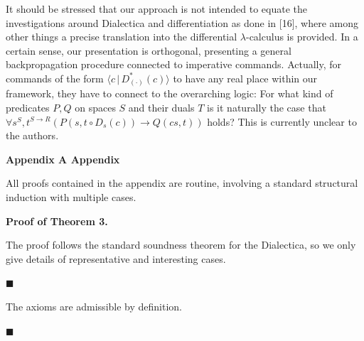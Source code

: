  
 
It should be stressed that our approach is not intended to equate the investigations around Dialectica and differentiation as done in [16], where among other things a precise translation into the differential $\lambda$-calculus is provided. In a certain sense, our presentation is orthogonal, presenting a general backpropagation procedure connected to imperative commands. Actually, for commands of the form $\langle{c}\,|\,{D^{\ast}_{(\cdot)}({c})}\rangle$ to have any real place within our framework, they have to connect to the overarching logic: For what kind of predicates $P,Q$ on spaces $S$ and their duals $T$ is it naturally the case that $\forall s^{S},t^{S\to R}\left(P(s,t\circ D_{s}({c}))\to Q(cs,t)\right)$ holds? This is currently unclear to the authors.\par
 
 
 


 
\par\medskip\noindent\textbf{Appendix A Appendix}\par
 
 
All proofs contained in the appendix are routine, involving a standard structural induction with multiple cases.\par
 
 
 
\par\medskip\noindent\textbf{Proof of Theorem 3.}\par
 
 
The proof follows the standard soundness theorem for the Dialectica, so we only give details of representative and interesting cases.\par
  
\par\noindent  $\blacksquare$ 
 
The axioms are admissible by definition.\par
 
 
 
\par\noindent  $\blacksquare$ 
 
